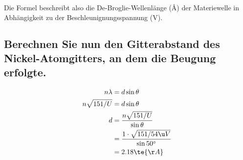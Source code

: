 \documentclass[ex,minted]{exercise}
\begin{document}
Die Formel beschreibt also die De-Broglie-Wellenlänge (\r A) der Materiewelle 
in Abhängigkeit zu der Beschleunignungsspannung (V).

\subsection{Berechnen Sie nun den Gitterabstand des Nickel-Atomgitters, an dem
die Beugung erfolgte.}

\dottedlinete

\begin{align*}
    n\lambda &= d\sin\theta\\
    n \sqrt{151/U} &= d\sin\theta\\
    d &= \frac{n \sqrt{151/U}}{\sin\theta}\\
    &= \frac{1\cdot \sqrt{151/54\u V}}{\sin 50^\circ}\\
    &= 2.18 \te{\r A}
\end{align*}
\end{document}
